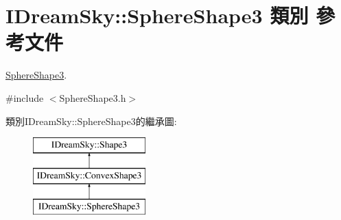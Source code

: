 \hypertarget{class_i_dream_sky_1_1_sphere_shape3}{}\section{I\+Dream\+Sky\+:\+:Sphere\+Shape3 類別 參考文件}
\label{class_i_dream_sky_1_1_sphere_shape3}


\hyperlink{class_i_dream_sky_1_1_sphere_shape3}{Sphere\+Shape3}.  




{\ttfamily \#include $<$Sphere\+Shape3.\+h$>$}

類別\+I\+Dream\+Sky\+:\+:Sphere\+Shape3的繼承圖\+:\begin{figure}[H]
\begin{center}
\leavevmode
\includegraphics[height=3.000000cm]{class_i_dream_sky_1_1_sphere_shape3}
\end{center}
\end{figure}
